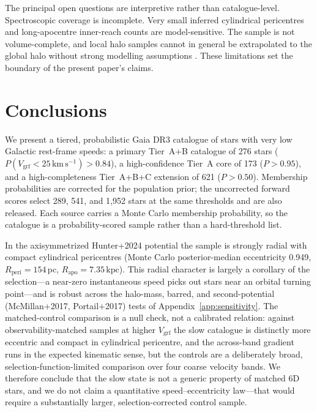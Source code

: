 \documentclass{aa}  %
\newcommand{\vgrf}{\ensuremath{V_{\mathrm{grf}}}\xspace}
\newcommand{\kms}{\ensuremath{\,\mathrm{km\,s^{-1}}}\xspace}
\newcommand{\kpc}{\ensuremath{\,\mathrm{kpc}}\xspace}
\newcommand{\Rperi}{R_{\mathrm{peri}}}
\newcommand{\Rapo}{R_{\mathrm{apo}}}
\begin{document}
The principal open questions are interpretive rather than catalogue-level.
Spectroscopic coverage is incomplete.
 Very small inferred cylindrical pericentres and long-apocentre inner-reach counts are model-sensitive.
The sample is not volume-complete, and local halo samples cannot in
general be extrapolated to the global halo without strong modelling
assumptions \citep{Sharpe2024}.  These limitations set the boundary of
the present paper's claims.

\section{Conclusions} \label{sec:conclusions}

We present a tiered, probabilistic Gaia DR3 catalogue of stars with very
low Galactic rest-frame speeds: a primary Tier~A+B catalogue of 276 stars
($P(\vgrf<25\kms)>0.84$), a high-confidence Tier~A core of 173 ($P>0.95$),
and a high-completeness Tier~A+B+C extension of 621 ($P>0.50$).  Membership
probabilities are corrected for the population prior; the uncorrected
forward scores select 289, 541, and 1{,}952 stars at the same thresholds
and are also released.  Each
source carries a Monte Carlo membership probability, so the catalogue is a
probability-scored sample rather than a hard-threshold list.

 In the axisymmetrized Hunter+2024 potential the sample is strongly radial
 with compact cylindrical pericentres (Monte Carlo posterior-median eccentricity 0.949,
$\Rperi=154$\,pc, $\Rapo=7.35$\kpc).  This radial character is largely a
corollary of the selection---a near-zero instantaneous speed picks out
stars near an orbital turning point---and is robust across the halo-mass,
barred, and second-potential (McMillan+2017, Portail+2017) tests of
Appendix~\ref{app:sensitivity}.  The matched-control comparison is a null
check, not a calibrated relation: against observability-matched samples at
higher $\vgrf$ the slow catalogue is distinctly more eccentric and
 compact in cylindrical pericentre, and the across-band gradient runs in the expected
kinematic sense, but the controls are a deliberately broad,
selection-function-limited comparison over four coarse velocity bands.  We
therefore conclude that the slow state is not a generic property of matched
6D stars, and we do not claim a quantitative speed--eccentricity
law---that would require a substantially larger, selection-corrected
control sample.
\end{document}
